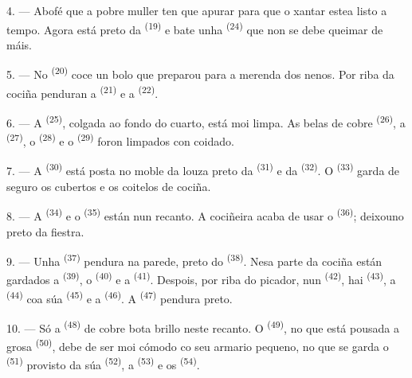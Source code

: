 4. --- Abofé que a pobre muller ten que apurar para que o xantar estea listo a tempo. Agora
está preto da  \textsuperscript{(19)} e bate unha
 \textsuperscript{(24)} que non se debe queimar de máis.

5. --- No  \textsuperscript{(20)} coce un bolo que preparou para a merenda dos
nenos. Por riba da cociña penduran a  \textsuperscript{(21)} e a
 \textsuperscript{(22)}.

\VUsaut{4.0mm}
\VUsaut{3.0mm}

6. --- A  \textsuperscript{(25)}, colgada ao fondo do cuarto, está
moi limpa. As belas  de cobre \textsuperscript{(26)}, a
 \textsuperscript{(27)}, o  \textsuperscript{(28)} e
o  \textsuperscript{(29)} foron limpados con coidado.

7. --- A  \textsuperscript{(30)} está posta no moble da louza preto da
 \textsuperscript{(31)} e da 
\textsuperscript{(32)}. O  \textsuperscript{(33)} garda de seguro os cubertos e
os coitelos de cociña.

8. --- A  \textsuperscript{(34)} e o  \textsuperscript{(35)}
están nun recanto. A cociñeira acaba de usar o 
\textsuperscript{(36)}; deixouno preto da fiestra.

9. --- Unha  \textsuperscript{(37)} pendura na parede, preto do
 \textsuperscript{(38)}. Nesa parte da cociña están gardados a
 \textsuperscript{(39)}, o 
\textsuperscript{(40)} e a  \textsuperscript{(41)}. Despois, por riba
do picador, nun  \textsuperscript{(42)}, hai
 \textsuperscript{(43)}, a 
\textsuperscript{(44)} coa súa  \textsuperscript{(45)} e a
 \textsuperscript{(46)}. A  \textsuperscript{(47)}
pendura preto.

10. --- Só a  \textsuperscript{(48)} de cobre bota brillo neste recanto. O
 \textsuperscript{(49)}, no que está pousada a grosa
 \textsuperscript{(50)}, debe de ser moi cómodo co seu armario
pequeno, no que se garda o  \textsuperscript{(51)} provisto da súa
 \textsuperscript{(52)}, a  \textsuperscript{(53)} e os
 \textsuperscript{(54)}.

